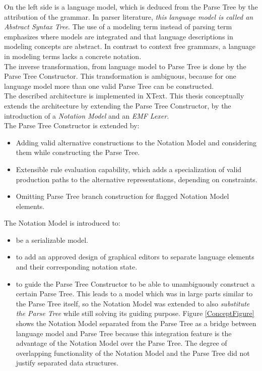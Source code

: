 On the left side is a language model, which is deduced from the Parse Tree by the attribution of the grammar. In parser literature, \emph{this language model is called an Abstract Syntax Tree}. The use of a modeling term instead of parsing term emphasizes where models are integrated and that language descriptions in modeling concepts are abstract. In contrast to context free grammars, a language in modeling terms lacks a concrete notation. \\
The inverse transformation, from language model to Parse Tree is done by the Parse Tree Constructor. This transformation is ambiguous, because for one language model more than one valid Parse Tree can be constructed. \\
The described architecture is implemented in XText. This thesis conceptually extends the architecture by extending the Parse Tree Constructor, by the introduction of a \emph{Notation Model} and an \emph{EMF Lexer}.\\
The Parse Tree Constructor is extended by:
\begin{itemize}
	\item Adding valid alternative constructions to the Notation Model and considering them while constructing the Parse Tree. 
	\item Extensible rule evaluation capability, which adds a specialization of valid production paths to the alternative representations, depending on constraints. 
	\item Omitting Parse Tree branch construction for flagged Notation Model elements.
\end{itemize}
The Notation Model is introduced to:
\begin{itemize}
	\item be a serializable model.
	\item to add an approved design of graphical editors to separate language elements and their corresponding notation state.
	\item to guide the Parse Tree Constructor to be able to unambiguously construct a certain Parse Tree. This leads to a model which was in large parts similar to the Parse Tree itself, so the Notation Model was extended to also \emph{substitute the Parse Tree} while still solving its guiding purpose. Figure \ref{ConceptFigure} shows the Notation Model separated from the Parse Tree as a bridge between language model and Parse Tree because this integration feature is the advantage of the Notation Model over the Parse Tree. The degree of overlapping functionality of the Notation Model and the Parse Tree did not justify separated data structures.
\end{itemize} 
